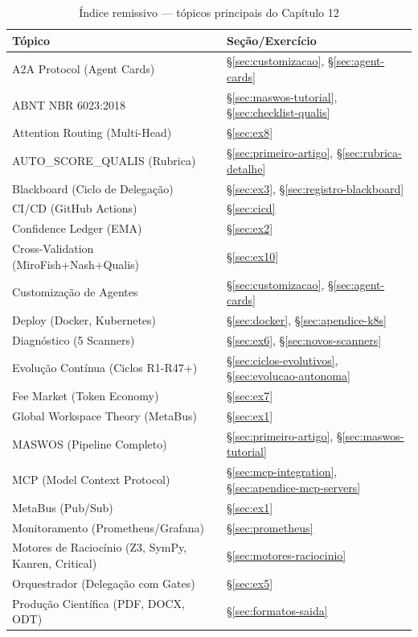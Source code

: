 \begin{table}[H]
\centering
\caption{Índice remissivo — tópicos principais do Capítulo 12}
\label{tab:indice-remissivo}
\begin{tabular}{@{}ll@{}}
\toprule
\textbf{Tópico} & \textbf{Seção/Exercício} \\
\midrule
A2A Protocol (Agent Cards) & \S\ref{sec:customizacao}, \S\ref{sec:agent-cards} \\
ABNT NBR 6023:2018 & \S\ref{sec:maswos-tutorial}, \S\ref{sec:checklist-qualis} \\
Attention Routing (Multi-Head) & \S\ref{sec:ex8} \\
AUTO\_SCORE\_QUALIS (Rubrica) & \S\ref{sec:primeiro-artigo}, \S\ref{sec:rubrica-detalhe} \\
Blackboard (Ciclo de Delegação) & \S\ref{sec:ex3}, \S\ref{sec:registro-blackboard} \\
CI/CD (GitHub Actions) & \S\ref{sec:cicd} \\
Confidence Ledger (EMA) & \S\ref{sec:ex2} \\
Cross-Validation (MiroFish+Nash+Qualis) & \S\ref{sec:ex10} \\
Customização de Agentes & \S\ref{sec:customizacao}, \S\ref{sec:agent-cards} \\
Deploy (Docker, Kubernetes) & \S\ref{sec:docker}, \S\ref{sec:apendice-k8s} \\
Diagnóstico (5 Scanners) & \S\ref{sec:ex6}, \S\ref{sec:novos-scanners} \\
Evolução Contínua (Ciclos R1-R47+) & \S\ref{sec:ciclos-evolutivos}, \S\ref{sec:evolucao-autonoma} \\
Fee Market (Token Economy) & \S\ref{sec:ex7} \\
Global Workspace Theory (MetaBus) & \S\ref{sec:ex1} \\
MASWOS (Pipeline Completo) & \S\ref{sec:primeiro-artigo}, \S\ref{sec:maswos-tutorial} \\
MCP (Model Context Protocol) & \S\ref{sec:mcp-integration}, \S\ref{sec:apendice-mcp-servers} \\
MetaBus (Pub/Sub) & \S\ref{sec:ex1} \\
Monitoramento (Prometheus/Grafana) & \S\ref{sec:prometheus} \\
Motores de Raciocínio (Z3, SymPy, Kanren, Critical) & \S\ref{sec:motores-raciocinio} \\
Orquestrador (Delegação com Gates) & \S\ref{sec:ex5} \\
Produção Científica (PDF, DOCX, ODT) & \S\ref{sec:formatos-saida} \\

\end{tabular}
\end{table}
